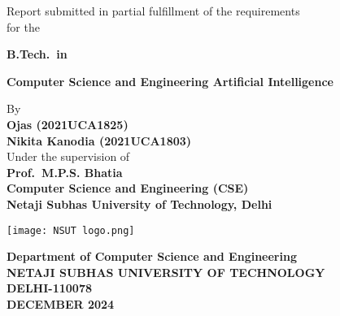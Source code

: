 \begin{titlepage}
    \begin{center}
    \fontsize{18pt}{1cm}\selectfont \textbf{\btptitle}
    
    \vspace*{1.4cm}
    \fontsize{14pt}{21pt}\selectfont Report submitted in partial fulfillment of the requirements\\ for the
    
    \vspace*{0.3cm}
    \fontsize{14pt}{1cm}\selectfont\textbf{B.Tech.\ in} 
    
    \textbf{Computer Science and Engineering Artificial Intelligence}
    
    \vspace*{0.6cm}
    By\\
    \textbf{Ojas (2021UCA1825)\\Nikita Kanodia (2021UCA1803)} \linebreak
    \\Under the supervision of\\
    \textbf{Prof.\ M.P.S. Bhatia\\Computer Science and Engineering (CSE)\\Netaji Subhas University of Technology, Delhi}
    
    \vspace*{0.2cm}
    \texttt{[image: NSUT logo.png]}
    
    \vspace*{0.3cm}
    \fontsize{16pt}{16pt}\selectfont \textbf{Department of Computer Science and Engineering}\\
    \vspace*{0.5cm}
    \fontsize{16pt}{16pt}\selectfont \textbf{NETAJI SUBHAS UNIVERSITY OF TECHNOLOGY\\DELHI-110078}\\
    \vspace*{0.5cm}
    \textbf{DECEMBER 2024}
    \end{center}
    \end{titlepage}